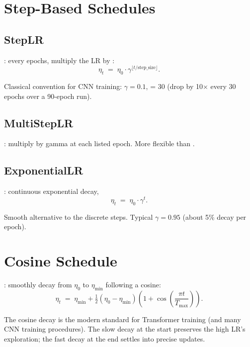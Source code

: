 \section{Step-Based Schedules}
\label{sec:lr_schedulers:step_based}

\subsection{StepLR}
\label{ssec:lr_schedulers:steplr}

: every
 epochs, multiply the LR by :
\[
\eta_t \;=\; \eta_0 \cdot \gamma^{\lfloor t / \text{step\_size} \rfloor}.
\]

Classical convention for CNN training: $\gamma = 0.1$,
 = 30 (drop by 10$\times$ every 30 epochs over a
90-epoch run).

\subsection{MultiStepLR}
\label{ssec:lr_schedulers:multisteplr}

:
multiply by gamma at each listed epoch. More flexible than
.

\subsection{ExponentialLR}
\label{ssec:lr_schedulers:exponentiallr}

: continuous exponential
decay,
\[
\eta_t \;=\; \eta_0 \cdot \gamma^t.
\]

Smooth alternative to the discrete steps. Typical
$\gamma = 0.95$ (about 5\% decay per epoch).

\section{Cosine Schedule}
\label{sec:lr_schedulers:cosine}

: smoothly
decay from $\eta_0$ to $\eta_{\min}$ following a cosine:
\[
\eta_t \;=\; \eta_{\min} + \tfrac{1}{2}(\eta_0 - \eta_{\min})
\left(1 + \cos\left(\frac{\pi t}{T_{\max}}\right)\right).
\]

The cosine decay is the modern standard for Transformer training
(and many CNN training procedures). The slow decay at the start
preserves the high LR's exploration; the fast decay at the end
settles into precise updates.

